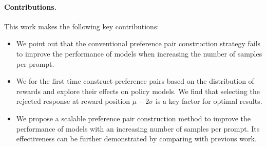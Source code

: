 \paragraph{Contributions.} 
This work makes the following key contributions:
\begin{itemize}
    \item We point out that the conventional preference pair construction strategy fails to improve the performance of models when increasing the number of samples per prompt.
    
    \item We for the first time construct preference pairs based on the distribution of rewards and explore their effects on policy models. We find that selecting the rejected response at reward position $\mu - 2\sigma$ is a key factor for optimal results.

    \item We propose a scalable preference pair construction method to improve the performance of models with an increasing number of samples per prompt. Its effectiveness can be further demonstrated by comparing with previous work.
\end{itemize}

    






















